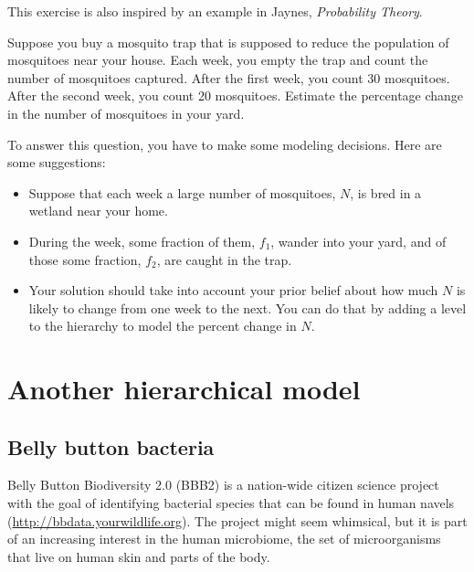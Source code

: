 \documentclass[12pt]{book}
\begin{document}
\begin{exercise}
This exercise is also inspired by an example in Jaynes, {\em
Probability Theory}.

Suppose you buy a mosquito trap that is supposed to reduce the
population of mosquitoes near your house.  Each
week, you empty the trap and count the number of mosquitoes
captured.  After the first week, you count 30 mosquitoes.
After the second week, you count 20 mosquitoes.  Estimate the
percentage change in the number of mosquitoes in your yard.

To answer this question, you have to make some modeling
decisions.  Here are some suggestions:

\begin{itemize}

\item Suppose that each week a large number of mosquitoes, $N$, is bred
in a wetland near your home.

\item During the week, some fraction of
them, $f_1$, wander into your yard, and of those some fraction, $f_2$,
are caught in the trap.

\item Your solution should take into account your prior belief
about how much $N$ is likely to change from one week to the next.
You can do that by adding a level to the hierarchy to
model the percent change in $N$.

\end{itemize}

\end{exercise}


\chapter{Another hierarchical model}
\label{species}

\section{Belly button bacteria}

Belly Button Biodiversity 2.0 (BBB2) is a nation-wide citizen
science project with the goal of identifying bacterial species that
can be found in human navels (\url{http://bbdata.yourwildlife.org}).
The project might seem whimsical, but it is part of an increasing
interest in the human microbiome, the set of microorganisms that live
on human skin and parts of the body.
\end{document}
